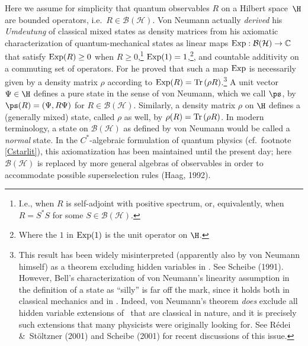 \documentclass[12pt,titlepage]{article}
\newcommand{\ca}{$C^*$-algebra} \newcommand{\jba}{JB-algebra}
\newcommand{\Hs}{Hilbert space} \newcommand{\Bs}{Banach space}
\newcommand{\raw}{\rightarrow} \newcommand{\rat}{\mapsto}
\newcommand{\Tr}{\mbox{\rm Tr}\,} \newcommand{\Ad}{{\rm Ad}}
\newcommand{\BH}{\mathcal{B}({\mathcal H})} \newcommand{\diri}{\int^{\oplus}}
\newcommand{\Exp}{{\rm Exp}}
\newcommand{\rh}{\rho} \newcommand{\sg}{\sigma}
\newcommand{\C}{{\mathbb C}} \newcommand{\D}{{\mathbb D}}
\begin{document}
Here we  assume for simplicity that 
 quantum observables $R$ on a \Hs\ $\H$ are bounded operators, i.e.\ $R\in\BH$. Von Neumann actually {\it derived} his {\it Umdeutung} of classical mixed states as density matrices from his axiomatic characterization of quantum-mechanical states as  linear maps $\Exp: \BH\raw \C$  that satisfy $\Exp(R)\geq 0$ when $R\geq 0$,\footnote{I.e., when $R$ is self-adjoint with positive spectrum, or, equivalently, when $R=S^*S$ for some $S\in \BH$.} $\Exp(1)=1$,\footnote{Where the $1$ in $\Exp(1)$ is the unit operator on $\H$.},  and countable additivity on a commuting set of operators. For he proved that such a map $\Exp$ is necessarily given by a density matrix $\rh$ according to $\Exp(R)=\Tr(\rh R)$.\footnote{This result has been widely misinterpreted (apparently also by von Neumann himself) as a theorem excluding hidden variables in \qm. See Scheibe (1991).  However, Bell's characterization of von Neumann's linearity assumption in the definition of a state as ``silly'' is far off the mark, since it holds  both in classical mechanics and in \qm.  Indeed, von Neumann's theorem {\it does} exclude all hidden variable extensions of \qm\ that are classical in nature, and it is precisely such extensions that many physicists were originally looking for. See R\'{e}dei \&\ St\"{o}ltzner (2001) and Scheibe (2001) 
for  recent discussions of this issue.} 
A unit vector $\Psi\in\H$ defines a pure state in the sense of von Neumann, which we call $\ps$, by $\ps(R)=(\Psi,R\Psi)$ for $R\in\BH$. Similarly, a density matrix $\rh$ on $\H$ defines a (generally mixed) state, called $\rh$ as well, by $\rh(R)=\Tr(\rh R)$.
In modern terminology, a state on $\BH$ as defined by von Neumann would be called a {\it normal} state.
 In the \ca ic formulation of quantum physics (cf.\ footnote  \ref{Cstarlit}), this axiomatization has been maintained until the present day; here $\BH$ is replaced by more general algebras of observables in order to accommodate possible superselection rules (Haag, 1992).  
\end{document}
